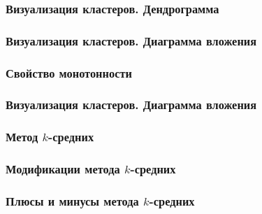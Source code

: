 \documentclass[12pt]{beamer}
\begin{document}
\begin{frame}\frametitle{Визуализация кластеров. Дендрограмма}
\end{frame}

\begin{frame}\frametitle{Визуализация кластеров. Диаграмма вложения}
\end{frame}

\begin{frame}\frametitle{Свойство монотонности}
\end{frame}

\begin{frame}\frametitle{Визуализация кластеров. Диаграмма вложения}
\end{frame}

\begin{frame}\frametitle{Метод $k$-средних}
\end{frame}

\begin{frame}\frametitle{Модификации метода $k$-средних}
\end{frame}

\begin{frame}\frametitle{Плюсы и минусы метода $k$-средних}
\end{frame}

\end{document}
